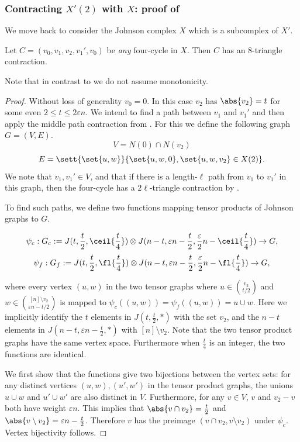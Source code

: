 \subsubsection[Contracting X'(2) with X]{Contracting \(X'(2)\) with \(X\): proof of  }\label{sec:contracting-X(2)}
We move back to consider the Johnson complex $X$ which is a subcomplex of $X'$. 

\begin{claim} \label{claim:four-cycle-in-X}
    Let \(C=(v_0,v_1,v_2,v_1',v_0)\) be \textit{any} four-cycle in \(X\). Then \(C\) has an \(8\)-triangle contraction.
\end{claim}
Note that in contrast to  we do not assume monotonicity.

\begin{proof}
    Without loss of generality \(v_0=0\). In this case \(v_2\) has \(\abs{v_2} = t\) for some even \(2 \leq t \leq 2\varepsilon n\).
    We intend to find a path between $v_1$ and $v_1'$ and then apply the middle path contraction from . For this we define the following graph \(G=(V,E)\).
    \[V = N(0) \cap N(v_2)\]
    \[E = \sett{\set{u,w}}{\set{u,w,0}, \set{u,w,v_2} \in X(2)}.\]
    We note that $v_1,  v_1'\in V$, and that if there is a length-$\ell$ path from \(v_1\) to \(v_1'\) in this graph, then the four-cycle has a $2\ell$-triangle contraction by .
    
    To find such paths, we define two functions mapping tensor products of Johnson graphs to $G$.
    
    \[\psi_c : G_c := J(t,\frac{t}{2},\ceil{\frac{t}{4}}) \otimes J(n-t, \varepsilon n - \frac{t}{2}, \frac{\varepsilon}{2}n -\ceil{\frac{t}{4}}) \to G,\]
    \[\psi_f : G_f :=J(t,\frac{t}{2},\fl{\frac{t}{4}}) \otimes J(n-t, \varepsilon n - \frac{t}{2}, \frac{\varepsilon}{2}n - \fl{\frac{t}{4}}) \to G,\]
    
    where every vertex $(u,w)$ in the two tensor graphs where $u\in \binom{v_2}{t/2}$ and $w \in \binom{[n]\setminus v_2}{\varepsilon n - t/2}$ is mapped to $\psi_c((u,w)) = \psi_f((u,w)) = u\cup w$. Here we implicitly identify the $t$ elements in $J(t,\frac{t}{2},*)$ with the set $v_2$, and the $n-t$ elements in $J(n-t, \varepsilon n - \frac{t}{2}, *)$  with $[n]\setminus v_2$.
    Note that the two tensor product graphs have the same vertex space.
    Furthermore when $\frac{t}{4}$ is an integer, the two functions are identical.

    We first show that the functions give two bijections between the vertex sets: for any distinct vertices $(u,w),(u',w')$ in the tensor product graphs, the unions $u\cup w$ and $u'\cup w'$ are also distinct in $V$. Furthermore, for any \(v \in V\), \(v\) and \(v_2-v\) both have weight \(\varepsilon n\). This implies that \(\abs{v \cap v_2} = \frac{t}{2}\) and \(\abs{v \setminus v_2} = \varepsilon n - \frac{t}{2}\).  Therefore $v$ has the preimage $(v \cap v_2,  v \setminus v_2)$ under $\psi_c$.
    Vertex bijectivity follows. 


\end{proof}
